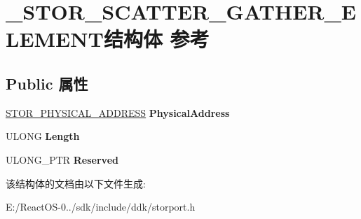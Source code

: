 \hypertarget{struct___s_t_o_r___s_c_a_t_t_e_r___g_a_t_h_e_r___e_l_e_m_e_n_t}{}\section{\+\_\+\+S\+T\+O\+R\+\_\+\+S\+C\+A\+T\+T\+E\+R\+\_\+\+G\+A\+T\+H\+E\+R\+\_\+\+E\+L\+E\+M\+E\+N\+T结构体 参考}
\label{struct___s_t_o_r___s_c_a_t_t_e_r___g_a_t_h_e_r___e_l_e_m_e_n_t}
\subsection*{Public 属性}
\begin{DoxyCompactItemize}
\item 
\mbox{\label{struct___s_t_o_r___s_c_a_t_t_e_r___g_a_t_h_e_r___e_l_e_m_e_n_t_a49772f91f91797debef8e24f4903b0d6}} 
\hyperlink{union___l_a_r_g_e___i_n_t_e_g_e_r}{S\+T\+O\+R\+\_\+\+P\+H\+Y\+S\+I\+C\+A\+L\+\_\+\+A\+D\+D\+R\+E\+SS} {\bfseries Physical\+Address}
\item 
\mbox{\label{struct___s_t_o_r___s_c_a_t_t_e_r___g_a_t_h_e_r___e_l_e_m_e_n_t_a8e4776ccdc43cabcddf71955eb82721c}} 
U\+L\+O\+NG {\bfseries Length}
\item 
\mbox{\label{struct___s_t_o_r___s_c_a_t_t_e_r___g_a_t_h_e_r___e_l_e_m_e_n_t_aeede9898029319b1d5babbfa837916bb}} 
U\+L\+O\+N\+G\+\_\+\+P\+TR {\bfseries Reserved}
\end{DoxyCompactItemize}


该结构体的文档由以下文件生成\+:\begin{DoxyCompactItemize}
\item 
E\+:/\+React\+O\+S-\/0../sdk/include/ddk/storport.\+h\end{DoxyCompactItemize}
